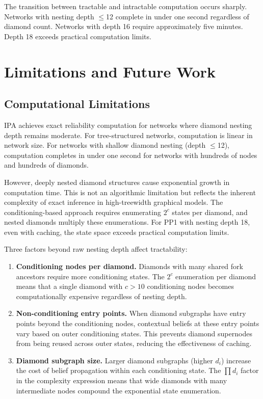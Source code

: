 The transition between tractable and intractable computation occurs sharply. Networks with nesting depth $\leq$12 complete in under one second regardless of diamond count. Networks with depth 16 require approximately five minutes. Depth 18 exceeds practical computation limits.

\section{Limitations and Future Work}

\subsection{Computational Limitations}

IPA achieves exact reliability computation for networks where diamond nesting depth remains moderate. For tree-structured networks, computation is linear in network size. For networks with shallow diamond nesting (depth $\leq$12), computation completes in under one second for networks with hundreds of nodes and hundreds of diamonds.

However, deeply nested diamond structures cause exponential growth in computation time. This is not an algorithmic limitation but reflects the inherent complexity of exact inference in high-treewidth graphical models. The conditioning-based approach requires enumerating $2^c$ states per diamond, and nested diamonds multiply these enumerations. For PP1 with nesting depth 18, even with caching, the state space exceeds practical computation limits.

Three factors beyond raw nesting depth affect tractability:

\begin{enumerate}
    \item \textbf{Conditioning nodes per diamond.} Diamonds with many shared fork ancestors require more conditioning states. The $2^c$ enumeration per diamond means that a single diamond with $c > 10$ conditioning nodes becomes computationally expensive regardless of nesting depth.

    \item \textbf{Non-conditioning entry points.} When diamond subgraphs have entry points beyond the conditioning nodes, contextual beliefs at these entry points vary based on outer conditioning states. This prevents diamond supernodes from being reused across outer states, reducing the effectiveness of caching.

    \item \textbf{Diamond subgraph size.} Larger diamond subgraphs (higher $d_i$) increase the cost of belief propagation within each conditioning state. The $\prod d_i$ factor in the complexity expression means that wide diamonds with many intermediate nodes compound the exponential state enumeration.
\end{enumerate}

